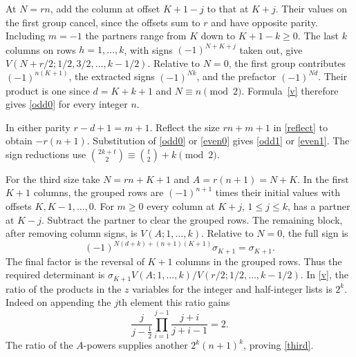 \documentclass[11pt]{article}
\begin{document}
At $N=rn$, add the column at offset $K+1-j$ to that at $K+j$. Their values on the first group cancel, since the offsets sum to $r$ and have opposite parity. Including $m=-1$ the partners range from $K$ down to $K+1-k\ge0$. The last $k$ columns on rows $h=1,\ldots,k$, with signs $(-1)^{N+K+j}$ taken out, give $V(N+r/2;1/2,3/2,\ldots,k-1/2)$. Relative to $N=0$, the first group contributes $(-1)^{n(K+1)}$, the extracted signs $(-1)^{Nk}$, and the prefactor $(-1)^{Nd}$. Their product is one since $d=K+k+1$ and $N\equiv n\pmod2$. Formula~\eqref{v} therefore gives \eqref{odd0} for every integer $n$.

In either parity $r-d+1=m+1$. Reflect the size $rn+m+1$ in \eqref{reflect} to obtain $-r(n+1)$. Substitution of \eqref{odd0} or \eqref{even0} gives \eqref{odd1} or \eqref{even1}. The sign reductions use $\binom{2k+t}{2}\equiv\binom t2+k\pmod2$.

For the third size take $N=rn+K+1$ and $A=r(n+1)=N+K$. In the first $K+1$ columns, the grouped rows are $(-1)^{n+1}$ times their initial values with offsets $K,K-1,\ldots,0$. For $m\ge0$ every column at $K+j$, $1\le j\le k$, has a partner at $K-j$. Subtract the partner to clear the grouped rows. The remaining block, after removing column signs, is $V(A;1,\ldots,k)$. Relative to $N=0$, the full sign is
\[
 (-1)^{N(d+k)+(n+1)(K+1)}\sigma_{K+1}=\sigma_{K+1}.
\]
The final factor is the reversal of $K+1$ columns in the grouped rows. Thus the required determinant is $\sigma_{K+1}V(A;1,\ldots,k)/V(r/2;1/2,\ldots,k-1/2)$. In \eqref{v}, the ratio of the products in the $z$ variables for the integer and half-integer lists is $2^k$. Indeed on appending the $j$th element this ratio gains
\[
 \frac{j}{j-\frac12}\prod_{i=1}^{j-1}\frac{j+i}{j+i-1}=2.
\]
The ratio of the $A$-powers supplies another $2^k(n+1)^k$, proving \eqref{third}.
\end{document}
